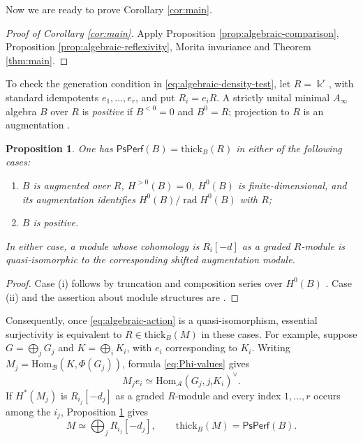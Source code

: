 \documentclass[11pt,letterpaper,reqno]{amsart}
\theoremstyle{plain}
\newtheorem{proposition}[proposition]{Proposition}
\theoremstyle{definition}
\theoremstyle{plain}
\theoremstyle{definition}
\numberwithin{equation}{section}
\begin{document}
Now we are ready to prove Corollary \ref{cor:main}.

\begin{proof}[Proof of Corollary \ref{cor:main}]
Apply Proposition \ref{prop:algebraic-comparison}, Proposition \ref{prop:algebraic-reflexivity}, Morita invariance \cite[Proposition 3.8]{Goodbody2026} and Theorem \ref{thm:main}.
\end{proof}

To check the generation condition in \eqref{eq:algebraic-density-test}, let $R=\Bbbk^r$, with standard idempotents $e_1,\ldots,e_r$, and put $R_i=e_iR$.
A strictly unital minimal $A_\infty$ algebra $B$ over $R$ is \emph{positive} if $B^{<0}=0$ and $B^0=R$; projection to $R$ is an augmentation \cite[Section 4.2]{Su-Yang2019}.

\begin{proposition}\label{prop:algebraic-generation}
One has $\mathsf{PsPerf}(B)=\mathrm{thick}_B(R)$ in either of the following cases:
\begin{enumerate}
    \item[(i)] $B$ is augmented over $R$, $H^{>0}(B)=0$, $H^0(B)$ is finite-dimensional, and its augmentation identifies $H^0(B)/\operatorname{rad}H^0(B)$ with $R$;
    \item[(ii)] $B$ is positive.
\end{enumerate}
In either case, a module whose cohomology is $R_i[-d]$ as a graded $R$-module is quasi-isomorphic to the corresponding shifted augmentation module.
\end{proposition}
\begin{proof}
Case (i) follows by truncation and composition series over $H^0(B)$ \cite[Proposition 2.2.2 and Corollary 2.2.3]{Booth-Goodbody-Opper2025}.
Case (ii) and the assertion about module structures are \cite[Lemmas 4.2--4.3]{Su-Yang2019}.
\end{proof}

Consequently, once \eqref{eq:algebraic-action} is a quasi-isomorphism, essential surjectivity is equivalent to $R\in\mathrm{thick}_B(M)$ in these cases.
For example, suppose $G=\bigoplus_jG_j$ and $K=\bigoplus_iK_i$, with $e_i$ corresponding to $K_i$.
Writing $M_j=\mathrm{Hom}_{\mathscr B}(K,\Phi(G_j))$, formula \eqref{eq:Phi-values} gives
\[
M_je_i\simeq\mathrm{Hom}_{\mathscr A}(G_j,j_!K_i)^\vee.
\]
If $H^*(M_j)$ is $R_{i_j}[-d_j]$ as a graded $R$-module and every index $1,\ldots,r$ occurs among the $i_j$, Proposition \ref{prop:algebraic-generation} gives
\begin{equation}\label{eq:algebraic-simple-images}
M\simeq\bigoplus_jR_{i_j}[-d_j],\qquad
\mathrm{thick}_B(M)=\mathsf{PsPerf}(B).
\end{equation}
\end{document}
